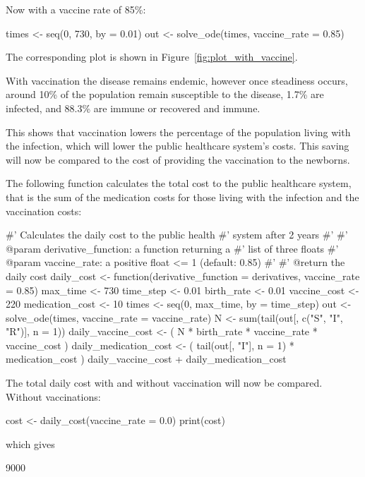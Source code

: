 Now with a vaccine rate of 85\%:

\begin{Rin}
times <- seq(0, 730, by = 0.01)
out <- solve_ode(times, vaccine_rate = 0.85)
\end{Rin}

The corresponding plot is shown in Figure~\ref{fig:plot_with_vaccine}.

With vaccination the disease remains endemic, however once steadiness occurs,
around 10\% of the population remain susceptible to the disease, 1.7\% are
infected, and 88.3\% are immune or recovered and immune.

This shows that vaccination lowers the percentage of the population living with
the infection, which will lower the public healthcare system's costs.
This saving will now be compared to the cost of providing the vaccination to the
newborns.

The following function calculates the total cost to the public healthcare
system, that is the sum of the medication costs for those living with the
infection and the vaccination costs:

\begin{Rin}
#' Calculates the daily cost to the public health
#' system after 2 years
#'
#' @param derivative_function: a function returning a
#'                             list of three floats
#' @param vaccine_rate: a positive float <= 1 (default: 0.85)
#'
#' @return the daily cost
daily_cost <- function(derivative_function = derivatives,
                       vaccine_rate = 0.85){
  max_time <- 730
  time_step <- 0.01
  birth_rate <- 0.01
  vaccine_cost <- 220
  medication_cost <- 10
  times <- seq(0, max_time, by = time_step)
  out <- solve_ode(times, vaccine_rate = vaccine_rate)
  N <- sum(tail(out[, c("S", "I", "R")], n = 1))
  daily_vaccine_cost <- (
    N * birth_rate * vaccine_rate * vaccine_cost
  )
  daily_medication_cost <- (
    tail(out[, "I"], n = 1) * medication_cost
  )
  daily_vaccine_cost + daily_medication_cost
}
\end{Rin}

The total daily cost with and without vaccination will now be compared. Without
vaccinations:

\begin{Rin}
cost <- daily_cost(vaccine_rate = 0.0)
print(cost)
\end{Rin}

which gives

\begin{Rout}
[1] 9000
\end{Rout}


